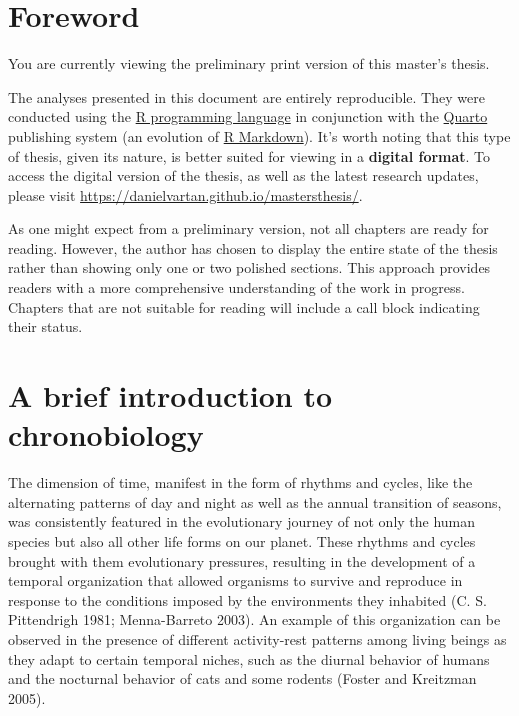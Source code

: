 \documentclass[
  12pt,
  a4paper,
  oneside]{tesesusp}
\begin{document}
\hypertarget{foreword}{%
\section{Foreword}\label{foreword}}

You are currently viewing the preliminary print version of this master's
thesis.

The analyses presented in this document are entirely reproducible. They
were conducted using the \href{https://www.r-project.org/}{R programming
language} in conjunction with the \href{https://quarto.org/}{Quarto}
publishing system (an evolution of
\href{https://rmarkdown.rstudio.com/}{R Markdown}). It's worth noting
that this type of thesis, given its nature, is better suited for viewing
in a \textbf{digital format}. To access the digital version of the
thesis, as well as the latest research updates, please visit
\url{https://danielvartan.github.io/mastersthesis/}.

As one might expect from a preliminary version, not all chapters are
ready for reading. However, the author has chosen to display the entire
state of the thesis rather than showing only one or two polished
sections. This approach provides readers with a more comprehensive
understanding of the work in progress. Chapters that are not suitable
for reading will include a call block indicating their status.

\hypertarget{a-brief-introduction-to-chronobiology}{%
\section{A brief introduction to
chronobiology}\label{a-brief-introduction-to-chronobiology}}

The dimension of time, manifest in the form of rhythms and cycles, like
the alternating patterns of day and night as well as the annual
transition of seasons, was consistently featured in the evolutionary
journey of not only the human species but also all other life forms on
our planet. These rhythms and cycles brought with them evolutionary
pressures, resulting in the development of a temporal organization that
allowed organisms to survive and reproduce in response to the conditions
imposed by the environments they inhabited (C. S. Pittendrigh 1981;
Menna-Barreto 2003). An example of this organization can be observed in
the presence of different activity-rest patterns among living beings as
they adapt to certain temporal niches, such as the diurnal behavior of
humans and the nocturnal behavior of cats and some rodents (Foster and
Kreitzman 2005).
\end{document}
